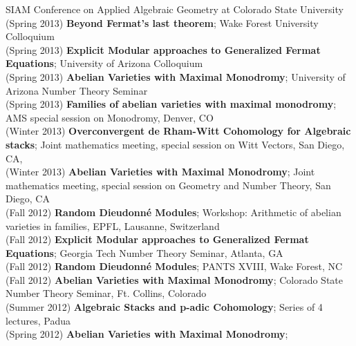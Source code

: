 \documentclass[margin,line]{res}
\begin{document}
\begin{resume}
SIAM Conference on Applied Algebraic Geometry at Colorado State University 
\vspace{.05cm}\\
(Spring 2013) \textbf{Beyond Fermat's last theorem};
Wake Forest University Colloquium
\vspace{.05cm}\\
(Spring 2013) \textbf{Explicit Modular approaches to Generalized Fermat Equations};
University of Arizona Colloquium
\vspace{.05cm}\\
(Spring 2013) \textbf{Abelian Varieties with Maximal Monodromy};
University of Arizona Number Theory Seminar 
\vspace{.05cm}\\
(Spring 2013) \textbf{Families of abelian varieties with maximal monodromy};
AMS special session on Monodromy, 
Denver, CO
\vspace{.05cm}\\
(Winter 2013) \textbf{Overconvergent de Rham-Witt Cohomology for Algebraic stacks};
Joint mathematics meeting, special session on Witt Vectors, San Diego, CA, 
\vspace{.05cm}\\
(Winter 2013) \textbf{Abelian Varieties with Maximal Monodromy};
Joint mathematics meeting, special session on Geometry and Number Theory, San Diego, CA
\vspace{.05cm}\\
(Fall 2012) \textbf{Random Dieudonn\'e Modules};
Workshop: Arithmetic of abelian varieties in families, EPFL, Lausanne, Switzerland 
\vspace{.05cm}\\
(Fall 2012) \textbf{Explicit Modular approaches to Generalized Fermat Equations};
Georgia Tech Number Theory Seminar, Atlanta, GA 
\vspace{.05cm}\\
(Fall 2012) \textbf{Random Dieudonn\'e Modules};
PANTS XVIII, Wake Forest, NC 
\vspace{.05cm}\\
(Fall 2012) \textbf{Abelian Varieties with Maximal Monodromy};
Colorado State Number Theory Seminar, Ft. Collins, Colorado 
\vspace{.05cm}\\
(Summer 2012) \textbf{Algebraic Stacks and p-adic Cohomology};
Series of 4 lectures, Padua
\vspace{.05cm}\\
(Spring 2012) \textbf{Abelian Varieties with Maximal Monodromy};

\end{resume}
\end{document}

